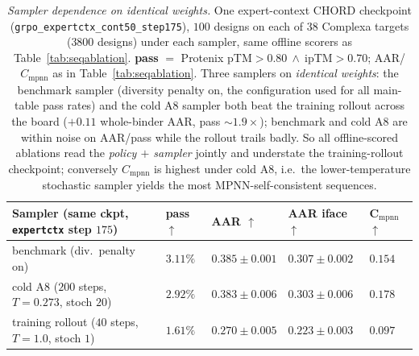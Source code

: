 \documentclass[11pt]{article}
\newcommand{\ttk}[1]{\texttt{\small #1}}
\begin{document}
\begin{table}[htbp]
\centering
{\renewcommand{\arraystretch}{1.2}%
\begin{tabular}{@{}>{\raggedright\arraybackslash}p{6.0cm}
                    >{\centering\arraybackslash}p{1.5cm}
                    >{\centering\arraybackslash}p{2.0cm}
                    >{\centering\arraybackslash}p{2.2cm}
                    >{\centering\arraybackslash}p{1.7cm}@{}}
\toprule
\textbf{Sampler (same ckpt, \ttk{expertctx} step $175$)} & \textbf{pass} $\uparrow$ & \textbf{AAR} $\uparrow$ & \textbf{AAR iface} $\uparrow$ & $\mathbf{C_{\mathrm{mpnn}}}$ $\uparrow$\\
\midrule
\rowcolor{aTint}benchmark (div.\ penalty on)                    & $\mathbf{3.11\%}$ & $\mathbf{0.385\pm0.001}$ & $\mathbf{0.307\pm0.002}$ & $0.154$\\
cold A8 ($200$ steps, $T{=}0.273$, stoch $20$)                & $2.92\%$ & $0.383\pm0.006$ & $0.303\pm0.006$ & $\mathbf{0.178}$\\
training rollout ($40$ steps, $T{=}1.0$, stoch $1$)           & $1.61\%$ & $0.270\pm0.005$ & $0.223\pm0.003$ & $0.097$\\
\bottomrule
\end{tabular}}
\caption{\emph{Sampler dependence on identical weights.} One expert-context CHORD checkpoint
(\ttk{grpo\_expertctx\_cont50\_step175}), $100$ designs on each of $38$ Complexa targets ($3800$
designs) under each sampler, same offline scorers as Table~\ref{tab:seqablation}. \textbf{pass} $=$
Protenix pTM$>\!0.80\ \wedge\ $ipTM$>\!0.70$; AAR/$C_{\mathrm{mpnn}}$ as in Table~\ref{tab:seqablation}.
Three samplers on \emph{identical weights}: the benchmark sampler (diversity penalty on, the
configuration used for all main-table pass rates) and the cold A8 sampler both beat the training
rollout across the board ($+0.11$ whole-binder AAR, pass $\sim\!1.9\times$); benchmark and cold A8
are within noise on AAR/pass while the rollout trails badly. So all offline-scored ablations read
the \emph{policy $+$ sampler} jointly and understate the training-rollout checkpoint; conversely
$C_{\mathrm{mpnn}}$ is highest under cold A8, i.e.\ the lower-temperature stochastic sampler yields
the most MPNN-self-consistent sequences.}
\label{tab:sampler}
\end{table}
\end{document}
